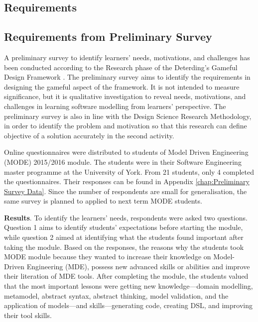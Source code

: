 \documentclass[12pt, a4paper]{report} \usepackage[titletoc]{appendix}
\begin{document}
\begin{appendices}

\chapter{Requirements}
\label{Requirements}

\section{Requirements from Preliminary Survey}
\label{Requirements from Preliminary Survey}
A preliminary survey to identify learners' needs, motivations, and challenges has been conducted according to the Research phase of the Deterding's Gameful Design Framework \cite{deterding2015lens}. The preliminary survey aims to identify the requirements in designing the gameful aspect of the framework. It is not intended to measure significance, but it is qualitative investigation to reveal needs, motivations, and challenges in learning software modelling from learners' perspective. The preliminary survey is also in line with the Design Science Research Methodology, in order to identify the problem and motivation so that this research can define objective of a solution accurately in the second activity. 

Online questionnaires were distributed to students of Model Driven Engineering (MODE) 2015/2016 module. The students were in their Software Engineering master programme at the University of York. From 21 students, only 4 completed the questionnaires. Their responses can be found in Appendix \autoref{chap:Preliminary Survey Data}. Since the number of respondents are small for generalisation, the same survey is planned to applied to next term MODE students.

\textbf{Results}. To identify the learners' needs, respondents were asked two questions. Question 1 aims to identify students' expectations before starting the module, while question 2 aimed at identifying what the students found important after taking the module. Based on the responses, the reasons why the students took MODE module because they wanted to increase their knowledge on Model-Driven Engineering (MDE), possess new advanced skills or abilities and improve their literation of MDE tools. After completing the module, the students valued that the most important lessons were getting new knowledge---domain modelling, metamodel, abstract syntax, abstract thinking, model validation, and the application of models---and skills---generating code, creating DSL, and improving their tool skills. 


\end{appendices}
\end{document}
